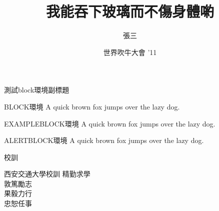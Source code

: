 \documentclass{beamer}
\title[演示短標題]
{我能吞下玻璃而不傷身體喲}
\author[multiple1902]
{張三} %
\institute[Xi'an Jiaotong University] %
{
  西安交通大學
}
\date[Short Occasion] %
{世界吹牛大會 '11}
\begin{document}
\begin{frame}
  \titlepage
\end{frame}


\begin{frame}{測試block環境}{副標題}
    \begin{block}{BLOCK環境}
        A quick brown fox jumps over the lazy dog.
    \end{block} \pause

    \begin{exampleblock}{EXAMPLEBLOCK環境}
        A quick brown fox jumps over the lazy dog.
    \end{exampleblock} \pause

    \begin{alertblock}{ALERTBLOCK環境}
        A quick brown fox jumps over the lazy dog.
    \end{alertblock} 
\end{frame}

\begin{frame}{校訓}

    \begin{block}{西安交通大學校訓}
        \centering \Huge
        精勤求學
        \\ \pause
        敦篤勵志
        \\ \pause
        果毅力行
        \\ \pause
        忠恕任事
    \end{block}

\end{frame}
\end{document}
